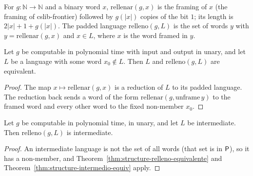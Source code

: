 \begin{definition}
  \label{def:structure-relleno}
  \leanok
  For $g : \mathbb{N} \to \mathbb{N}$ and a binary word $x$, $\mathrm{rellenar}(g, x)$ is the framing of
  $x$ (the framing of cslib-frontier) followed by $g(|x|)$ copies of the bit $1$; its length is
  $2|x| + 1 + g(|x|)$. The padded language $\mathrm{relleno}(g, L)$ is the set of words $y$ with $y =
  \mathrm{rellenar}(g, x)$ and $x \in L$, where $x$ is the word framed in $y$.
  \own{}
\end{definition}

\begin{theorem}
  \label{thm:structure-relleno-equivalente}
  \leanok
  Let $g$ be computable in polynomial time with input and output in unary, and let $L$ be a
  language with some word $x_0 \notin L$. Then $L$ and $\mathrm{relleno}(g, L)$ are equivalent.
  \own{}
\end{theorem}

\begin{proof}
  \leanok
  The map $x \mapsto \mathrm{rellenar}(g, x)$ is a reduction of $L$ to its padded language. The
  reduction back sends a word of the form $\mathrm{rellenar}(g, \mathrm{unframe}\,y)$ to the framed word
  and every other word to the fixed non-member $x_0$.
\end{proof}

\begin{theorem}
  \label{thm:structure-relleno-intermedio}
  \leanok
  Let $g$ be computable in polynomial time, in unary, and let $L$ be intermediate. Then
  $\mathrm{relleno}(g, L)$ is intermediate.
  \own{}
\end{theorem}

\begin{proof}
  \leanok
  An intermediate language is not the set of all words (that set is in $\mathsf{P}$), so it has a
  non-member, and Theorem~\ref{thm:structure-relleno-equivalente} and
  Theorem~\ref{thm:structure-intermedio-equiv} apply.
\end{proof}

